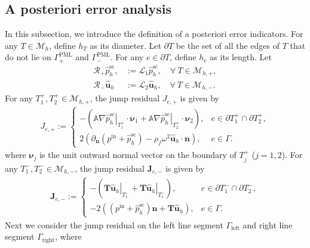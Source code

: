 \documentclass[final,3p,times]{elsarticle}
\begin{document}
\subsection{A posteriori error analysis}
In this subsection, we introduce the definition of a posteriori error indicators. For any $T \in \mathscr{M}_h$, define $h_T$ as its diameter. Let $\partial T$ be the set of all the edges of $T$ that do not lie on $\Gamma_+^{\mathrm{PML}}$ and $\Gamma_-^{\mathrm{PML}}$. For any $e \in \partial T$, define $h_e$ as its length. Let
\begin{align*}
	\mathcal{R}_+ \hat{p}^{\mathrm{sc}}_h,& :=\mathcal{L}_1 \hat{p}^{\mathrm{sc}}_h, \quad \forall~T \in \mathscr{M}_{h, +}, \\
	\mathcal{R}_- \hat{\boldsymbol{u}}_h& :=\mathcal{L}_2 \hat{\boldsymbol{u}}_h, \quad \forall~T \in \mathscr{M}_{h, -}.
\end{align*}
For any $T_1^+, T_2^+ \in \mathscr{M}_{h, +}$, the jump residual $J_{e, +}$ is given by
\begin{align*}
	J_{e, +}:=
	\begin{cases}
		- (\left.\mathbb{A} \nabla \hat{p}^{\mathrm{sc}}_h\right|_{T_1^+} \cdot \boldsymbol{\nu}_1 + \left.\mathbb{A} \nabla \hat{p}^{\mathrm{sc}}_h\right|_{T_2^+} \cdot \boldsymbol{\nu}_2), & e \in \partial {T_1^+} \cap \partial {T_2^+},\\ 2\left(\partial_{\boldsymbol{n}}\left(p^\mathrm{in}+\hat{p}^{\mathrm{sc}}_h\right)-\rho_f \omega^2 \hat{\boldsymbol{u}}_h \cdot \boldsymbol{n}\right), & e \in \Gamma.
	\end{cases}
\end{align*}
where $\boldsymbol{\nu}_j$ is the unit outward normal vector on the boundary of $T_j^+$ ($j=1,2$). For any $T_1^-, T_2^- \in \mathscr{M}_{h, -}$, the jump residual $\boldsymbol{J}_{e, -}$ is given by
\begin{align*}
	\boldsymbol{J}_{e, -}:=
	\begin{cases}
		-\left(\left.\boldsymbol{T} \hat{\boldsymbol{u}}_h\right|_{T_1^-}+\left.\boldsymbol{T} \hat{\boldsymbol{u}}_h\right|_{T_1^-}\right), & e \in \partial {T_1^-} \cap \partial {T_2^-},\\ -2\left(\left(p^\mathrm{in}+\hat{p}^{\mathrm{sc}}_h\right) \boldsymbol{n}+\boldsymbol{T} \hat{\boldsymbol{u}}_h\right), & e \in \Gamma.
	\end{cases}
\end{align*}
Next we consider the jump residual on the left line segment $\Gamma_{\text {left}}$ and right line segment $\Gamma_{\text {right}}$, where
\end{document}
